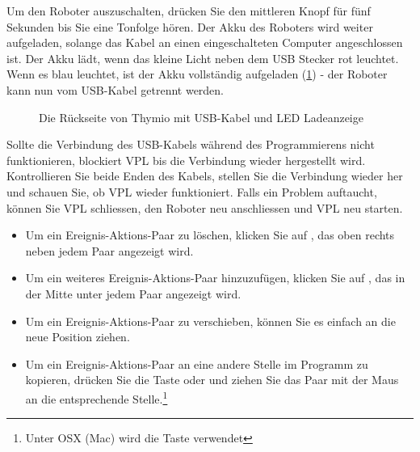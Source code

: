 
Um den Roboter auszuschalten, drücken Sie den mittleren Knopf für fünf Sekunden bis Sie eine Tonfolge hören. Der Akku des Roboters wird weiter aufgeladen, solange das Kabel an einen eingeschalteten Computer angeschlossen ist. Der Akku lädt, wenn das kleine Licht neben dem USB Stecker rot leuchtet. Wenn es blau leuchtet, ist der Akku vollständig aufgeladen (\cref{fig.back}) - der Roboter kann nun vom USB-Kabel getrennt werden.


\begin{figure}
\begin{center}
\caption{Die Rückseite von Thymio mit USB-Kabel und LED Ladeanzeige}\label{fig.back}
\end{center}
\end{figure}

Sollte die Verbindung des USB-Kabels während des Programmierens nicht funktionieren, blockiert VPL bis die Verbindung wieder hergestellt wird. Kontrollieren Sie beide Enden des Kabels, stellen Sie die Verbindung wieder her und schauen Sie, ob VPL wieder funktioniert. Falls ein Problem auftaucht, können Sie VPL schliessen, den Roboter neu anschliessen und VPL neu starten.



\begin{itemize}
	\item Um ein Ereignis-Aktions-Paar zu löschen, klicken Sie auf , das oben rechts neben jedem Paar angezeigt wird.
	\item Um ein weiteres Ereignis-Aktions-Paar hinzuzufügen, klicken Sie auf , das in der Mitte unter jedem Paar  angezeigt wird.
	\item Um ein Ereignis-Aktions-Paar zu verschieben, können Sie es einfach an die neue Position ziehen.
	\item Um ein Ereignis-Aktions-Paar an eine andere Stelle im Programm zu kopieren, drücken Sie die Taste  oder  und ziehen Sie das Paar mit der Maus an die entsprechende Stelle.\label{p.copy-pairs}\footnote{Unter OSX (Mac) wird die Taste  verwendet}
\end{itemize}


